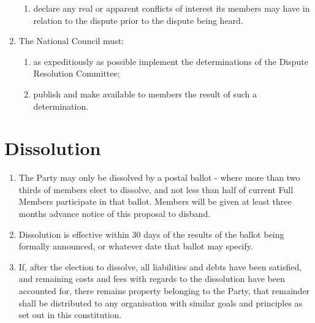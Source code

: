 \documentclass[a4paper,titlepage,8.5pt]{article}
\begin{document}
\begin{enumerate}
\begin{enumerate}
\item declare any real or apparent conflicts of interest its members may have in relation to the dispute prior to the dispute being heard.
\end{enumerate}
\item The National Council must:
\begin{enumerate}
\item as expeditiously as possible implement the determinations of the Dispute Resolution Committee;
\item publish and make available to members the result of such a determination.
\end{enumerate}
\end{enumerate}

\section{Dissolution}

\begin{enumerate}
\item The Party may only be dissolved by a postal ballot - where more than two thirds of members elect to dissolve, and not less than half of current Full Members participate in that ballot. Members will be given at least three months advance notice of this proposal to disband.
\item Dissolution is effective within 30 days of the results of the ballot being formally announced, or whatever date that ballot may specify.
\item If, after the election to dissolve, all liabilities and debts have been satisfied, and remaining costs and fees with regards to the dissolution have been accounted for, there remains property belonging to the Party, that remainder shall be distributed to any organisation with similar goals and principles as set out in this constitution.
\end{enumerate}
\end{document}
